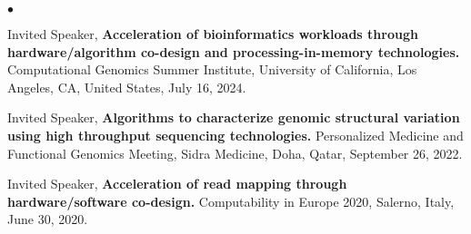 \documentclass[margin,line]{res}
\newenvironment{list2}{
  \begin{list}{$\bullet$}{%
      \setlength{\itemsep}{0.1cm}
      \setlength{\parsep}{0in} \setlength{\parskip}{0in}
      \setlength{\topsep}{0in} \setlength{\partopsep}{0in} 
      \setlength{\leftmargin}{0.2in}}}{\end{list}}
\newcommand{\junk}[1]{}
\begin{document}
\begin{resume}
\begin{list2}
\junk{
\item
  Invited Speaker, 
      {\bf  Acceleration of read mapping through hardware/algorithm co-design.}
  Genome Informatics 2024, Hinxton, England.
  November 13, 2024.
}

\junk{
\item 
Invited Speaker,
\textbf{Locally consistent parsing in genomic
applications: from sketching to phylogenetic analysis.}
SAFARI Group, ETH Zurich, Zurich, Switzerland. November 11, 2024.
}

\junk{
\item 
Invited Speaker, 
{\bf Algorithms to characterize genomic structural variation using high throughput sequencing technologies.} Galen Medicine Days-2024: Precision Medicine in Health and Disease International Symposium, İzmir, Turkey, October 3, 2024.
}

\item
  Invited Speaker, 
      {\bf  Acceleration of bioinformatics workloads through hardware/algorithm co-design and processing-in-memory technologies.}
  Computational Genomics Summer Institute, University of California, Los Angeles, CA, United States,
  July 16, 2024.

\junk{
\item
  Lecture, 
      {\bf  Characterization of genomic structural variation using various sequencing technologies.}
  Computational Genomics Summer Institute, University of California, Los Angeles, CA, United States,
  July 26, 2023.
}

\junk{
\item
  Invited Speaker, 
      {\bf  Acceleration of read mapping through hardware/algorithm co-design.}
  Computational Genomics Summer Institute, University of California, Los Angeles, CA, United States,
  July 20, 2023.
}
\item
Invited Speaker, {\bf Algorithms to characterize genomic structural variation using high throughput sequencing technologies.} Personalized Medicine and Functional Genomics Meeting, Sidra Medicine, Doha, Qatar, September 26, 2022.

\junk{
\item
  Lecture, 
      {\bf  Characterization of genomic structural variation using various sequencing technologies.}
  Clinical genomics and NGS hybrid course, European School of Genetic Medicine and Acıbadem University, İstanbul, Turkey,
  October 13, 2020.
  }
 \item
 Invited Speaker,
{\bf Acceleration of read mapping through hardware/software co-design.}
Computability in Europe 2020, Salerno, Italy, June 30, 2020.


\end{list2}
\end{resume}
\end{document}
